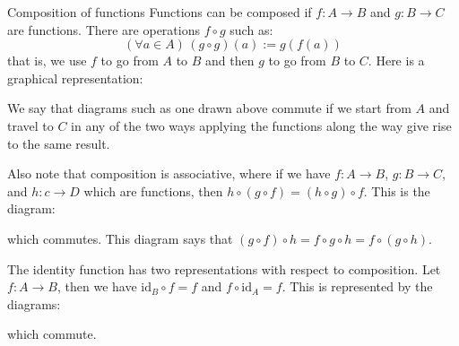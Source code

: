 \documentclass{report}
\begin{document}
\begin{definition}[\label{def:1.2.3}]{Composition of functions}
    Functions can be composed if $f : A \rightarrow B$ and $g : B \rightarrow C$ are functions. There are operations $f \circ g$ such as:
        \begin{equation*}
            (\forall a \in A) \, (g \circ g)(a) := g(f(a))
        \end{equation*}
    that is, we use $f$ to go from $A$ to $B$ and then $g$ to go from $B$ to $C$. Here is a graphical representation:
        \begin{center}
        \end{center}
\end{definition}

We say that diagrams such as one drawn above commute if we start from $A$ and travel to $C$ in any of the two ways applying the functions along the way give rise to the same result.

Also note that composition is associative, where if we have $f: A \rightarrow B$, $g: B \rightarrow C$, and $h: c \rightarrow D$ which are functions, then $h \circ (g \circ f) = (h \circ g) \circ f$. This is the diagram:
    \begin{center}
    \end{center}
which commutes. This diagram says that $(g \circ f) \circ h = f \circ g \circ h = f \circ (g \circ h)$.

The identity function has two representations with respect to composition. Let $f : A \rightarrow B$, then we have $\text{id}_{B}\circ f = f$ and $f \circ \text{id}_{A} = f$. This is represented by the diagrams:
    \begin{center}
    \end{center}
which commute.
\end{document}
